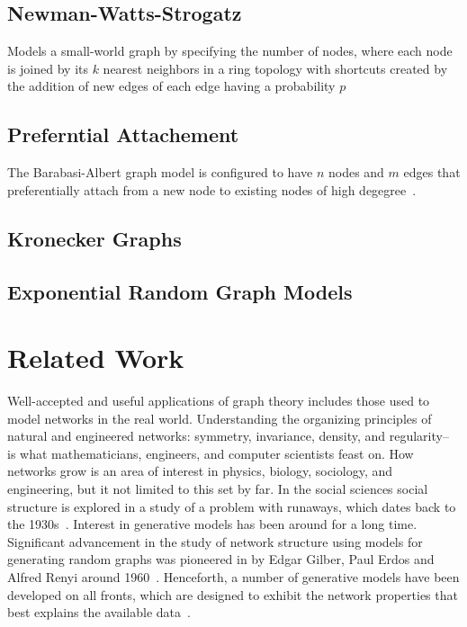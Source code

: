\subsection{Newman-Watts-Strogatz}
Models a small-world graph by specifying the number of nodes, where each node is joined by its $k$ nearest neighbors in a ring topology with shortcuts created by the addition of new edges of each edge having a probability $p$

\subsection{Preferntial Attachement}
The Barabasi-Albert graph model is configured to have $n$ nodes and $m$ edges that preferentially attach from a new node to existing nodes of high degegree~\cite{barabasi1999emergence}.

\subsection{Kronecker Graphs}

\subsection{Exponential Random Graph Models}




\section{Related Work}
Well-accepted and useful applications of graph theory includes those used to model networks in the real world. Understanding the organizing principles of natural and engineered networks: symmetry, invariance, density, and regularity-- is what mathematicians, engineers, and computer scientists feast on.  How networks grow is an area of interest in physics, biology, sociology, and engineering, but it not limited to this set by far. In the social sciences social structure is explored in a study of a problem with runaways, which dates back to the 1930s~\cite{borgatti2009network}.  %
Interest in generative models has been around for a long time. Significant advancement in the study of network structure using models for generating random graphs was pioneered in by Edgar Gilber, Paul Erdos and Alfred Renyi around 1960~\cite{gilbert1959,erd6s1960evolution}. Henceforth, a number of generative models have been developed on all fronts, which are designed to exhibit the network properties that best explains the available data~\cite{Kemp05082008}.   

